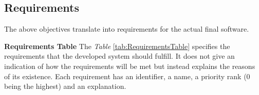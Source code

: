 
\subsection{Requirements}

The above objectives translate into requirements for the actual final software.

\textbf{Requirements Table} The \emph{Table} \ref{tab:RequirementsTable} specifies the requirements that the developed system should fulfill. It does not give an indication of how the requirements will be met but instead explains the reasons of its existence. Each requirement has an identifier, a name, a priority rank (0 being the highest) and an explanation.

